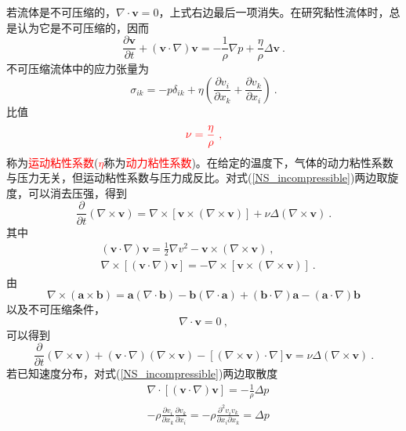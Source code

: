 \documentclass[12pt,a4paper]{article}
\renewcommand{\vec}[1]{\boldsymbol{#1}}
\begin{document}
若流体是不可压缩的，$\nabla \cdot \vec{v} = 0$，上式右边最后一项消失。在研究黏性流体时，总是认为它是不可压缩的，因而
\begin{equation}
\frac{\partial \vec{v} }{\partial t} + (\vec{v}\cdot \nabla) \vec{v} = -\frac{1}{\rho}\nabla p +\frac{\eta}{\rho} \Delta \vec{v} ~.
\label{NS_incompressible}
\end{equation}
不可压缩流体中的应力张量为
\begin{equation}
\sigma_{ik} = -p\delta_{ik} +\eta \left(\frac{\partial v_i}{\partial x_k} +\frac{\partial v_k}{\partial x_i} \right) ~.
\end{equation}
比值
\begin{equation}
\color{red} \nu = \frac{\eta}{\rho} ~,
\end{equation}
称为\textcolor{red}{运动粘性系数}(\textcolor{red}{$\eta$}称为\textcolor{red}{动力粘性系数})。在给定的温度下，气体的动力粘性系数与压力无关，但运动粘性系数与压力成反比。对式(\ref{NS_incompressible})两边取旋度，可以消去压强，得到
\begin{equation*}
\frac{\partial }{\partial t} (\nabla \times \vec{v}) = \nabla \times [\vec{v} \times (\nabla \times \vec{v}) ] +\nu \Delta (\nabla \times \vec{v}) ~.
\end{equation*}
其中
\begin{align*}
& (\vec{v}\cdot \nabla) \vec{v} = \frac{1}{2} \nabla v^2 -\vec{v} \times (\nabla \times \vec{v}) ~, \\
& \nabla \times [ (\vec{v}\cdot \nabla) \vec{v} ] = -\nabla \times [  \vec{v} \times (\nabla \times \vec{v})] ~.
\end{align*}
由
\begin{equation*}
\nabla \times (\vec{a} \times \vec{b}) = \vec{a}(\nabla \cdot \vec{b}) -\vec{b}(\nabla \cdot \vec{a}) +(\vec{b}\cdot \nabla) \vec{a} -(\vec{a}\cdot \nabla) \vec{b}
\end{equation*}
以及不可压缩条件，
\begin{equation*}
\nabla \cdot \vec{v} = 0 ~,
\end{equation*}
可以得到
\begin{equation}
\frac{\partial }{\partial t} (\nabla \times \vec{v}) +(\vec{v}\cdot \nabla)(\nabla \times \vec{v}) -[(\nabla \times \vec{v}) \cdot \nabla] \vec{v} = \nu \Delta (\nabla \times \vec{v})  ~.
\end{equation}
若已知速度分布，对式(\ref{NS_incompressible})两边取散度
\begin{align*}
& \nabla \cdot [ (\vec{v}\cdot \nabla) \vec{v} ] = -\frac{1}{\rho}\Delta p \\
& -\rho \frac{\partial v_i}{\partial x_k} \frac{\partial v_k}{\partial x_i} = -\rho \frac{\partial^2 v_i v_k}{\partial x_i\partial x_k} = \Delta p
\end{align*}
\end{document}
